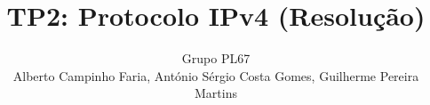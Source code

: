 \documentclass{llncs}
\begin{document}
\mainmatter

\title{TP2: Protocolo IPv4 (Resolução)}

\author{
  Grupo PL67 \\
  Alberto Campinho Faria,
  António Sérgio Costa Gomes,
  Guilherme Pereira Martins
  }


\date{}

\maketitle





\end{document}
